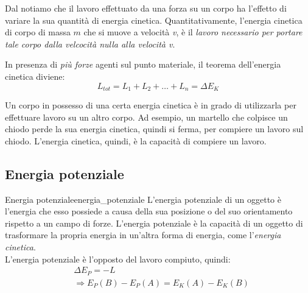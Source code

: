 \documentclass[12pt]{report}
\newcounter{definition}
\newcommand{\namerefl}[1]{%
	\bgroup
	\let\nmu\MakeLowercase
	\nameref{#1}\egroup}
\newcommand{\nmu}{}
\begin{document}
	Dal \namerefl{th:forza_vive_cinetica} notiamo che il lavoro effettuato da una forza su un corpo ha l'effetto di variare la sua quantità di energia cinetica. Quantitativamente, l'energia cinetica di corpo di massa $m$ che si muove a velocità \textit{v}, è il \textit{lavoro necessario per portare tale corpo dalla velcocità nulla alla velocità v}.
	\begin{note}{}{}
		In presenza di \textit{più forze} agenti sul punto materiale, il teorema dell'energia cinetica diviene:
		\[
		L_{tot} = L_1 + L_2 + \dots + L_n = \Delta E_K
		\]
	\end{note}
	Un corpo in possesso di una certa energia cinetica è in grado di utilizzarla per effettuare lavoro su un altro corpo. Ad esempio, un martello che colpisce un chiodo perde la sua energia cinetica, quindi si ferma, per compiere un lavoro sul chiodo. L'energia cinetica, quindi, è la capacità di compiere un lavoro.
	\subsection{Energia potenziale}
	\begin{definition}{\nmu Energia potenziale}{energia_potenziale}
		L'energia potenziale di un oggetto è l'energia che esso possiede a causa della sua posizione o del suo orientamento rispetto a un campo di forze. L'energia potenziale è la capacità di un oggetto di trasformare la propria energia in un'altra forma di energia, come l'\textit{energia cinetica}. \\
		L'energia potenziale è l'opposto del lavoro compiuto, quindi:
		\begin{align*}
		&\Delta E_P = -L \\
		&\Rightarrow E_P(B) - E_P(A) = E_K(A) - E_K(B)
		\end{align*}
	\end{definition}
\end{document}
